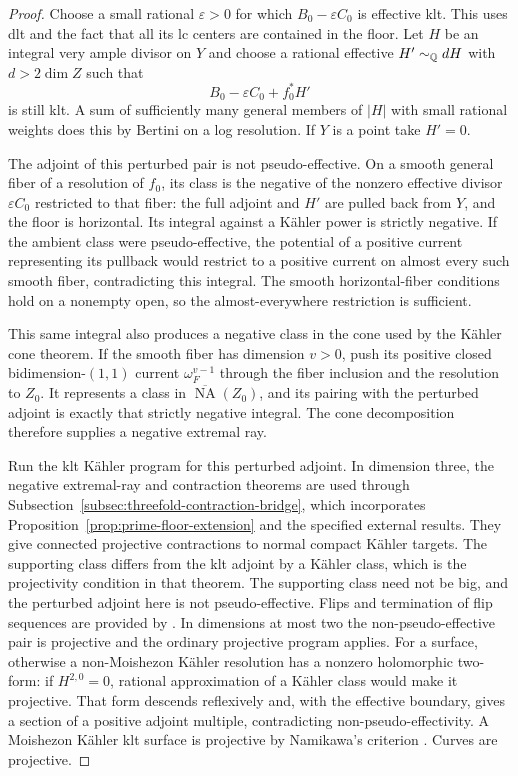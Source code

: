 \begin{proof}

Choose a small rational \(\varepsilon>0\) for which
\(B_0-\varepsilon C_0\) is effective klt.  This uses dlt and the fact
that all its lc centers are contained in the floor.  Let \(H\) be an
integral very ample divisor on \(Y\) and choose a rational effective
\(H'\sim_\mathbb Q dH\) with \(d>2\dim Z\) such that
\[
 B_0-\varepsilon C_0+f_0^*H'
\]
is still klt.  A sum of sufficiently many general members of \(|H|\)
with small rational weights does this by Bertini on a log resolution.
If \(Y\) is a point take \(H'=0\).

The adjoint of this perturbed pair is not pseudo-effective.  On a smooth
general fiber of a resolution of \(f_0\), its class is the negative of
the nonzero effective divisor \(\varepsilon C_0\) restricted to that
fiber: the full adjoint and \(H'\) are pulled back from \(Y\), and the
floor is horizontal.  Its integral against a K\"ahler power is strictly
negative.  If the ambient class were pseudo-effective, the potential of
a positive current representing its pullback would restrict to a positive
current on almost every such smooth fiber, contradicting this integral.
The smooth horizontal-fiber conditions hold on a nonempty open, so the
almost-everywhere restriction is sufficient.

This same integral also produces a negative class in the cone used by the
K\"ahler cone theorem.  If the smooth fiber has dimension \(v>0\), push
its positive closed bidimension-\((1,1)\) current \(\omega_F^{v-1}\)
through the fiber inclusion and the resolution to \(Z_0\).  It represents
a class in \(\overline{\operatorname{NA}}(Z_0)\), and its pairing with
the perturbed adjoint is exactly that strictly negative integral.  The
cone decomposition therefore supplies a negative extremal ray.

Run the klt K\"ahler program for this perturbed adjoint.  In dimension
three, the negative extremal-ray and contraction theorems
\cite[Corollary~5.3 and Theorem~5.5]{DasHaconPaun2024} are used through
Subsection~\ref{subsec:threefold-contraction-bridge}, which incorporates
Proposition~\ref{prop:prime-floor-extension} and the specified external
results.  They give
connected projective contractions to normal compact K\"ahler targets.
The supporting class differs from the klt adjoint by a K\"ahler class,
which is the projectivity condition in that theorem.  The supporting
class need not be big, and the perturbed adjoint here is not
pseudo-effective.  Flips and termination
of flip sequences are provided by
\cite[Theorems~2.24--2.25]{DasHacon2024}.  In dimensions at most two the
non-pseudo-effective pair is projective and the ordinary projective program
applies.  For a surface, otherwise a non-Moishezon K\"ahler resolution
has a nonzero holomorphic two-form: if \(H^{2,0}=0\), rational approximation
of a K\"ahler class would make it projective.  That form descends
reflexively and, with the effective boundary, gives a section of a positive
adjoint multiple, contradicting non-pseudo-effectivity.  A Moishezon
K\"ahler klt surface is projective by Namikawa's criterion
\cite[Corollary~6']{Namikawa2002}.  Curves are projective.


\end{proof}
